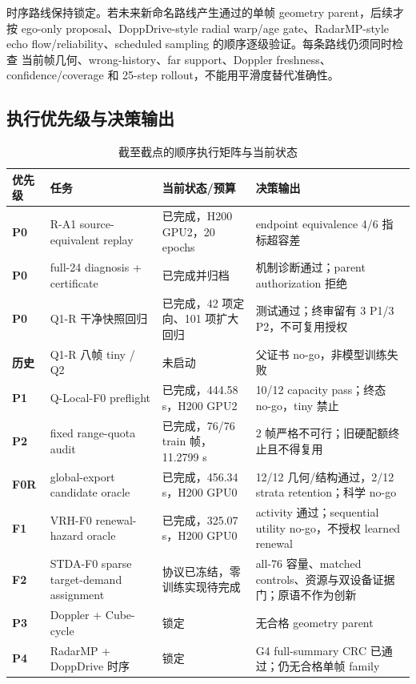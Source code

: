 \documentclass[11pt,a4paper,fontset=none]{ctexart}
\begin{document}
时序路线保持锁定。若未来新命名路线产生通过的单帧 geometry parent，后续才按
ego-only proposal、DoppDrive-style radial warp/age gate、RadarMP-style echo
flow/reliability、scheduled sampling 的顺序逐级验证。每条路线仍须同时检查
当前帧几何、wrong-history、far support、Doppler freshness、confidence/coverage
和 25-step rollout，不能用平滑度替代准确性。

\subsection{执行优先级与决策输出}

\begin{table}[H]
\centering
\small
\caption{截至截点的顺序执行矩阵与当前状态}
\begin{tabularx}{\textwidth}{>{\raggedright\arraybackslash\bfseries}p{1.4cm} >{\raggedright\arraybackslash}p{4.5cm} >{\raggedright\arraybackslash}p{3.0cm} Y}
\toprule
优先级 & 任务 & 当前状态/预算 & 决策输出 \\
\midrule
P0 & R-A1 source-equivalent replay & 已完成，H200 GPU2，20 epochs & endpoint equivalence 4/6 指标超容差 \\
P0 & full-24 diagnosis + certificate & 已完成并归档 & 机制诊断通过；parent authorization 拒绝 \\
P0 & Q1-R 干净快照回归 & 已完成，42 项定向、101 项扩大回归 & 测试通过；终审留有 3 P1/3 P2，不可复用授权 \\
历史 & Q1-R 八帧 tiny / Q2 & 未启动 & 父证书 no-go，非模型训练失败 \\
P1 & Q-Local-F0 preflight & 已完成，444.58 s，H200 GPU2 & 10/12 capacity pass；终态 no-go，tiny 禁止 \\
P2 & fixed range-quota audit & 已完成，76/76 train 帧，11.2799 s & 2 帧严格不可行；旧硬配额终止且不得复用 \\
F0R & global-export candidate oracle & 已完成，456.34 s，H200 GPU0 & 12/12 几何/结构通过，2/12 strata retention；科学 no-go \\
F1 & VRH-F0 renewal-hazard oracle & 已完成，325.07 s，H200 GPU0 & activity 通过；sequential utility no-go，不授权 learned renewal \\
F2 & STDA-F0 sparse target-demand assignment & 协议已冻结，零训练实现待完成 & all-76 容量、matched controls、资源与双设备证据门；原语不作为创新 \\
P3 & Doppler + Cube-cycle & 锁定 & 无合格 geometry parent \\
P4 & RadarMP + DoppDrive 时序 & 锁定 & G4 full-summary CRC 已通过；仍无合格单帧 family \\
\bottomrule
\end{tabularx}
\end{table}
\end{document}
